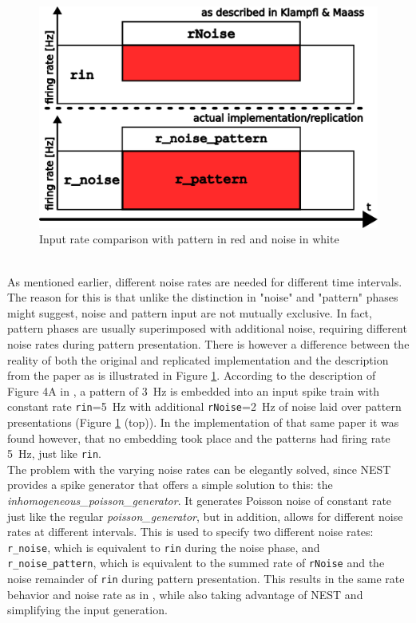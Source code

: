 \begin{figure}[htbp]
    \centering
    \includegraphics[width=0.9\columnwidth]{Figures/input_rates.pdf}
    \caption{Input rate comparison with pattern in red and noise in white}
    \label{fig:input_rates}
\end{figure}
\\
As mentioned earlier, different noise rates are needed for different time intervals. The reason for this is that unlike the distinction in "noise" and "pattern" phases might suggest, noise and pattern input are not mutually exclusive. In fact, pattern phases are usually superimposed with additional noise, requiring different noise rates during pattern presentation. There is however a difference between the reality of both the original and replicated implementation and the description from the paper as is illustrated in Figure \ref{fig:input_rates}. According to the description of Figure 4A in \parencite{klampfl_maass_2013}, a pattern of \SI{3}{\hertz} is embedded into an input spike train with constant rate \texttt{rin}=\SI{5}{\hertz} with additional \texttt{rNoise}=\SI{2}{\hertz} of noise laid over pattern presentations (Figure \ref{fig:input_rates} (top)). In the implementation of that same paper it was found however, that no embedding took place and the patterns had firing rate \SI{5}{\hertz}, just like \texttt{rin}.\\
The problem with the varying noise rates can be elegantly solved, since NEST provides a spike generator that offers a simple solution to this: the \textit{inhomogeneous\_poisson\_generator}. It generates Poisson noise of constant rate just like the regular \textit{poisson\_generator}, but in addition, allows for different noise rates at different intervals. This is used to specify two different noise rates: \texttt{r\_noise}, which is equivalent to \texttt{rin} during the noise phase, and \texttt{r\_noise\_pattern}, which is equivalent to the summed rate of \texttt{rNoise} and the noise remainder of \texttt{rin} during pattern presentation. This results in the same rate behavior and noise rate as in \parencite{klampfl_maass_2013}, while also taking advantage of NEST and simplifying the input generation.
